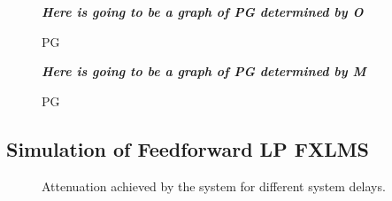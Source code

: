 \begin{figure}[H]
	\centering
	\textbf{\textit{Here is going to be a graph of PG determined by O}}
	\caption{PG }
	\label{fig:PredictO}
\end{figure}
\begin{figure}[H]
	\centering
	\textbf{\textit{Here is going to be a graph of PG determined by M}}
	\caption{PG }
	\label{fig:PredictM}
\end{figure}

\subsection{Simulation of Feedforward LP FXLMS}
\begin{figure}[H]
	\centering
	
	\caption{Attenuation achieved by the system for different system delays.}
	\label{Fig:Reference to noise ratio}
\end{figure}















